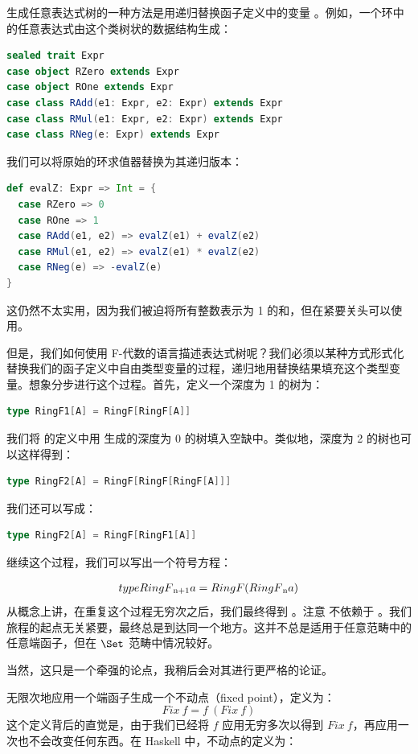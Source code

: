 生成任意表达式树的一种方法是用递归替换函子定义中的变量 。例如，一个环中的任意表达式由这个类树状的数据结构生成：

\begin{lstlisting}[language=Scala]
sealed trait Expr
case object RZero extends Expr
case object ROne extends Expr
case class RAdd(e1: Expr, e2: Expr) extends Expr
case class RMul(e1: Expr, e2: Expr) extends Expr
case class RNeg(e: Expr) extends Expr
\end{lstlisting}
我们可以将原始的环求值器替换为其递归版本：

\begin{lstlisting}[language=Scala]
def evalZ: Expr => Int = {
  case RZero => 0
  case ROne => 1
  case RAdd(e1, e2) => evalZ(e1) + evalZ(e2)
  case RMul(e1, e2) => evalZ(e1) * evalZ(e2)
  case RNeg(e) => -evalZ(e)
}
\end{lstlisting}
这仍然不太实用，因为我们被迫将所有整数表示为 1 的和，但在紧要关头可以使用。

但是，我们如何使用 F-代数的语言描述表达式树呢？我们必须以某种方式形式化替换我们的函子定义中自由类型变量的过程，递归地用替换结果填充这个类型变量。想象分步进行这个过程。首先，定义一个深度为 1 的树为：

\begin{lstlisting}[language=Scala]
type RingF1[A] = RingF[RingF[A]]
\end{lstlisting}
我们将  的定义中用  生成的深度为 0 的树填入空缺中。类似地，深度为 2 的树也可以这样得到：

\begin{lstlisting}[language=Scala]
type RingF2[A] = RingF[RingF[RingF[A]]]
\end{lstlisting}
我们还可以写成：

\begin{lstlisting}[language=Scala]
type RingF2[A] = RingF[RingF1[A]]
\end{lstlisting}
继续这个过程，我们可以写出一个符号方程：

\begin{align}
  type RingF\textsubscript{n+1} a = RingF (RingF\textsubscript{n} a)
\end{align}
从概念上讲，在重复这个过程无穷次之后，我们最终得到 。注意  不依赖于 。我们旅程的起点无关紧要，最终总是到达同一个地方。这并不总是适用于任意范畴中的任意端函子，但在 $\Set$ 范畴中情况较好。

当然，这只是一个牵强的论点，我稍后会对其进行更严格的论证。

无限次地应用一个端函子生成一个不动点（fixed point），定义为：
\[\mathit{Fix}\ f = f\ (\mathit{Fix}\ f)\]
这个定义背后的直觉是，由于我们已经将 $f$ 应用无穷多次以得到 $\mathit{Fix}\ f$，再应用一次也不会改变任何东西。在 Haskell 中，不动点的定义为：

